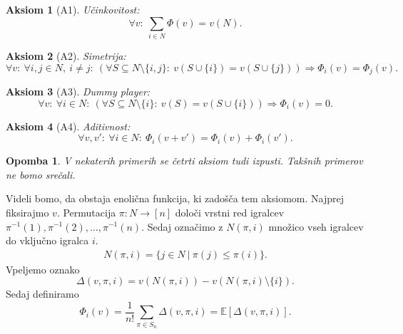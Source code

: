 \documentclass[10pt, a4paper]{article}
\newtheorem{aksiom}{Aksiom}[section]
\newtheorem*{opomba}{Opomba}
\begin{document}
\begin{aksiom}[A1]
  Učinkovitost:
  $$\forall v:\ \sum_{i \in N} \Phi(v) = v(N).$$
\end{aksiom}

\begin{aksiom}[A2]
  Simetrija:
  $$\forall v:\ \forall i, j \in N,\ i \neq j:\ \left(\forall S \subseteq N\setminus \{i, j\}:\ v(S \cup \{i\}) = v (S \cup \{j\}) \right) \Rightarrow \Phi_i (v) = \Phi_j (v).$$ 
\end{aksiom}

\begin{aksiom}[A3]
  Dummy player:  
  $$\forall v:\ \forall i \in N:\ \left(\forall S \subseteq N \setminus \{i\}:\ v(S) = v(S \cup \{i\}) \right) \Rightarrow \Phi_i (v) = 0.$$
\end{aksiom}

\begin{aksiom}[A4]
  Aditivnost: 
  $$\forall v, v':\ \forall i \in N:\ \Phi_i (v + v') = \Phi_i (v) + \Phi_i (v').$$
\end{aksiom}

\begin{opomba}
  V nekaterih primerih se četrti aksiom tudi izpusti.
  Takšnih primerov ne bomo srečali.
\end{opomba}

Videli bomo, da obstaja enolična funkcija, ki zadošča tem aksiomom.
Najprej fiksirajmo $v$. Permutacija $\pi: N \to [n]$ določi vrstni red 
igralcev $\pi^{-1} (1), \pi^{-1} (2),\dots, \pi^{-1} (n)$.
Sedaj označimo z $N(\pi, i)$ množico vseh igralcev do vključno igralca $i$.
\begin{align*}
  N(\pi, i) = \{j \in N\ |\ \pi(j) \leq \pi (i)\}.
\end{align*}
Vpeljemo oznako 
$$\Delta(v, \pi, i) = v(N(\pi, i)) - v (N(\pi, i) \setminus \{i\}).$$
Sedaj definiramo 
\begin{equation}
  \Phi_i (v) = \frac{1}{n!} \sum_{\pi \in S_n} \Delta (v, \pi, i) = \mathbb{E} [\Delta(v, \pi, i)].\tag{$5$} \label{eq:5}
\end{equation}
\end{document}
